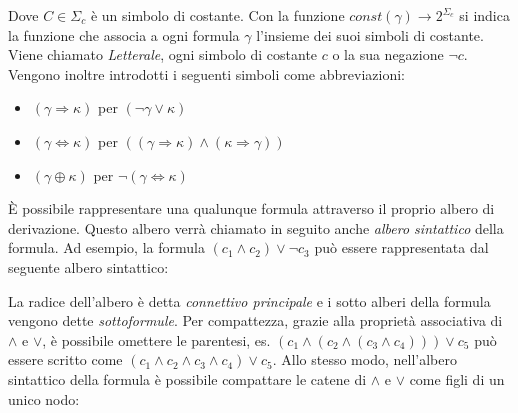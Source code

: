 \documentclass[./main.tex]{subfiles}
\begin{document}
Dove $C \in \Sigma_c$ è un simbolo di costante. Con la funzione $const(\gamma) \rightarrow 2^{\Sigma_c}$ si indica la funzione che
associa a ogni formula $\gamma$ l'insieme dei suoi simboli di costante. 
Viene chiamato \textit{Letterale}, ogni simbolo di costante $c$ o la sua negazione $\lnot c$.
Vengono inoltre introdotti i seguenti simboli come abbreviazioni:

\begin{itemize}
    \item $(\gamma \Rightarrow \kappa)$ per $(\lnot \gamma \lor \kappa)$
    \item $(\gamma \Leftrightarrow \kappa)$ per $((\gamma \Rightarrow \kappa) \land (\kappa \Rightarrow \gamma))$
    \item $(\gamma \oplus \kappa)$ per $\lnot(\gamma \Leftrightarrow \kappa)$
\end{itemize}

È possibile rappresentare una qualunque formula attraverso il proprio albero di derivazione. Questo albero 
verrà chiamato in seguito anche \textit{albero sintattico} della formula. Ad esempio, la formula 
$(c_1 \land c_2) \lor \lnot c_3$ può essere rappresentata dal seguente albero sintattico:

\begin{center}
\end{center}


La radice dell'albero è detta \textit{connettivo principale} e i sotto alberi della formula vengono dette \textit{sottoformule}.
 Per compattezza, grazie alla proprietà associativa di $\land$ e $\lor$, è possibile omettere le parentesi, es. 
$(c_1 \land (c_2 \land (c_3 \land c_4))) \lor c_5$ può essere scritto come $(c_1 \land c_2 \land c_3 \land c_4) \lor c_5$. 
Allo stesso modo, nell'albero sintattico della formula è possibile compattare le catene di $\land$ e $\lor$ come figli di un unico nodo:

\begin{center}
\end{center}
\end{document}
